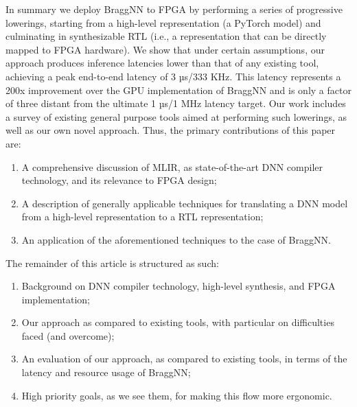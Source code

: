 In summary we deploy BraggNN to FPGA by performing a series of progressive lowerings, starting from a high-level representation (a PyTorch model) and culminating in synthesizable RTL (i.e., a representation that can be directly mapped to FPGA hardware).
We show that under certain assumptions, our approach produces inference latencies lower than that of any existing tool, achieving a peak end-to-end latency of 3 µs/333 KHz.
This latency represents a 200x improvement over the GPU implementation of BraggNN and is only a factor of three distant from the ultimate 1 µs/1 MHz latency target.
Our work includes a survey of existing general purpose tools aimed at performing such lowerings, as well as our own novel approach.
Thus, the primary contributions of this paper are:
\begin{enumerate}
	\item A comprehensive discussion of MLIR, as state-of-the-art DNN compiler technology, and its relevance to FPGA design;
	\item A description of generally applicable techniques for translating a DNN model from a high-level representation to a RTL representation;
	\item An application of the aforementioned techniques to the case of BraggNN.
\end{enumerate}
The remainder of this article is structured as such:
\begin{enumerate}
	\item Background on DNN compiler technology, high-level synthesis, and FPGA implementation;
	\item Our approach as compared to existing tools, with particular on difficulties faced (and overcome);
	\item An evaluation of our approach, as compared to existing tools, in terms of the latency and resource usage of BraggNN;
	\item High priority goals, as we see them, for making this flow more ergonomic.
\end{enumerate}
